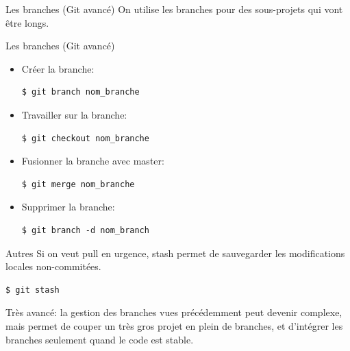 \documentclass[presentation]{beamer}
\begin{document}
\begin{frame}[fragile]{Les branches (Git avancé)}
	On utilise les branches pour des sous-projets qui vont être longs.
	\begin{figure}%
	\end{figure}
\end{frame}

\begin{frame}[fragile]{Les branches (Git avancé)}
\begin{itemize}
\item Créer la branche:
\begin{lstlisting}
$ git branch nom_branche
\end{lstlisting}
\item Travailler sur la branche:
\begin{lstlisting}
$ git checkout nom_branche
\end{lstlisting}
\item Fusionner la branche avec master:
\begin{lstlisting}
$ git merge nom_branche
\end{lstlisting}
\item Supprimer la branche:
\begin{lstlisting}
$ git branch -d nom_branch
\end{lstlisting}
\end{itemize}
\end{frame}

\begin{frame}[fragile]{Autres}
Si on veut pull en urgence, stash permet de sauvegarder les modifications locales non-commitées.
\begin{lstlisting}
$ git stash
\end{lstlisting}
\pause
Très avancé: la gestion des branches vues précédemment peut devenir complexe, mais permet de couper un très gros projet en plein de branches, et d'intégrer les branches seulement quand le code est stable.
\end{frame}
\end{document}
